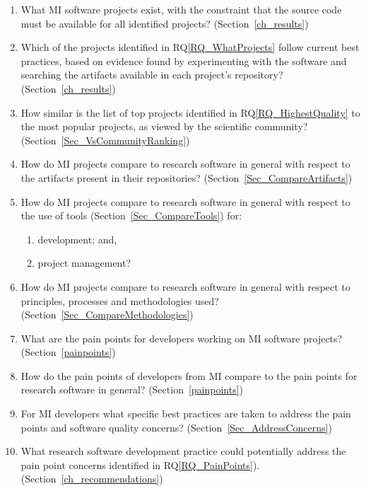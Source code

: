 \documentclass[final, 3p, times, authoryear]{elsarticle}
\newcounter{rqnum} %
\newcommand{\rqref}[1]{RQ\ref{#1}}
\begin{document}
\begin{enumerate}
	\item[RQ\refstepcounter{rqnum}\therqnum \label{RQ_WhatProjects}:] What MI
	software projects exist, with the constraint that the source code must be
	available for all identified projects? (Section~\ref{ch_results})
	\item [RQ\refstepcounter{rqnum}\therqnum \label{RQ_HighestQuality}:] Which
	of the projects identified in \rqref{RQ_WhatProjects} follow current best
	practices, based on evidence found by experimenting with the software and
	searching the artifacts available in each project's repository?
	(Section~\ref{ch_results})
	\item [RQ\refstepcounter{rqnum}\therqnum \label{RQ_CompareHQ2Popular}:] How
	similar is the list of top projects identified in \rqref{RQ_HighestQuality}
	to the most popular projects, as viewed by the scientific community?
	(Section~\ref{Sec_VsCommunityRanking})
    \item [RQ\refstepcounter{rqnum}\therqnum \label{RQ_CompareArtifacts}:] How
	do MI projects compare to research software in general with respect to the
	artifacts present in their repositories?
	(Section~\ref{Sec_CompareArtifacts})
	\item [RQ\refstepcounter{rqnum}\therqnum \label{RQ_CompareToolsProjMngmnt}:]
	How do MI projects compare to research software in general with respect to
	the use of tools (Section~\ref{Sec_CompareTools}) for:
	\begin{enumerate} 
		\item [\rqref{RQ_CompareToolsProjMngmnt}.a] development; and,
		\item [\rqref{RQ_CompareToolsProjMngmnt}.b] project management?
	\end{enumerate}
	\item [RQ\refstepcounter{rqnum}\therqnum \label{RQ_CompareMethodologies}:]
	How do MI projects compare to research software in general with respect to
	principles, processes and methodologies used?
	(Section~\ref{Sec_CompareMethodologies})
	\item [RQ\refstepcounter{rqnum}\therqnum \label{RQ_PainPoints}:] What are
	the pain points for developers working on MI software projects?
	(Section~\ref{painpoints})
	\item [RQ\refstepcounter{rqnum}\therqnum \label{RQ_ComparePainPoints}:] How
	do the pain points of developers from MI compare to the pain points
	for research software in general? (Section~\ref{painpoints})
	\item [RQ\refstepcounter{rqnum}\therqnum \label{RQ_Concerns}:] For MI
	developers what specific best practices are taken to address the pain points
	and software quality concerns? (Section~\ref{Sec_AddressConcerns})
	\item [RQ\refstepcounter{rqnum}\therqnum \label{RQ_Recommend}:]
	What research software development practice could potentially address the
	pain point concerns identified in \rqref{RQ_PainPoints}).
	(Section~\ref{ch_recommendations})

\end{enumerate}
\end{document}
